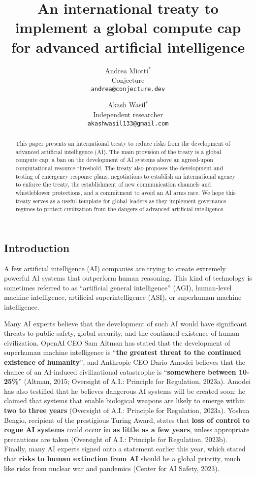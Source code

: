 \documentclass[12pt,a4paper]{article}
\title{An international treaty to implement a global compute cap for advanced artificial intelligence}
\author{
Andrea Miotti$^*$\\
\small{Conjecture}\\
\small\texttt{andrea@conjecture.dev}
\and 
Akash Wasil$^*$\\
\small{Independent researcher}\\
\small\texttt{akashwasil133@gmail.com}
}
\date{}
\begin{document}
\maketitle

\begin{abstract}
\noindent
This paper presents an international treaty to reduce risks from the development of advanced artificial intelligence (AI). The main provision of the treaty is a global compute cap: a ban on the development of AI systems above an agreed-upon computational resource threshold. The treaty also proposes the development and testing of emergency response plans, negotiations to establish an international agency to enforce the treaty, the establishment of new communication channels and whistleblower protections, and a commitment to avoid an AI arms race. We hope this treaty serves as a useful template for global leaders as they implement governance regimes to protect civilization from the dangers of advanced artificial intelligence. 

\end{abstract}

\newpage
\tableofcontents

\subsection{Introduction}

A few artificial intelligence (AI) companies are trying to create extremely powerful AI systems that outperform human reasoning. This kind of technology is sometimes referred to as “artificial general intelligence” (AGI), human-level machine intelligence, artificial superintelligence (ASI), or superhuman machine intelligence.

Many AI experts believe that the development of such AI would have significant threats to public safety, global security, and the continued existence of human civilization. OpenAI CEO Sam Altman has stated that the development of superhuman machine intelligence is “\textbf{the greatest threat to the continued existence of humanity}”, and Anthropic CEO Dario Amodei believes that the chance of an AI-induced civilizational catastrophe is “\textbf{somewhere between 10-25\%}” (Altman, 2015; Oversight of A.I.: Principle for Regulation, 2023a). Amodei has also testified that he believes dangerous AI systems will be created soon: he claimed that systems that enable biological weapons are likely to emerge within \textbf{two to three years} (Oversight of A.I.: Principle for Regulation, 2023a). Yoshua Bengio, recipient of the prestigious Turing Award, states that \textbf{loss of control to rogue AI systems} could occur \textbf{in as little as a few years}, unless appropriate precautions are taken (Oversight of A.I.: Principle for Regulation, 2023b). Finally, many AI experts signed onto a statement earlier this year, which stated that \textbf{risks to human extinction from AI} should be a global priority, much like risks from nuclear war and pandemics (Center for AI Safety, 2023).
\end{document}
